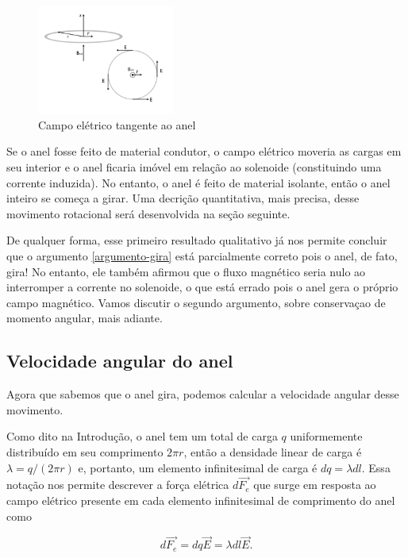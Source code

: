 \documentclass[
	article,
	11pt,
	oneside,
	a4paper,
	english,
	brazil,
	sumario=tradicional
	]{abntex2}
\begin{document}
\begin{figure}[htb]
    \caption{Campo elétrico tangente ao anel}\label{campo-tangencial-img}
    \centering
    \includegraphics[width=0.4\textwidth]{corrente_tangencial.png}
\end{figure}

Se o anel fosse feito de material condutor, o campo elétrico moveria as cargas em seu interior e o anel ficaria imóvel em relação ao solenoide (constituindo uma corrente induzida). No entanto, o anel é feito de material isolante, então o anel inteiro se começa a girar. Uma decrição quantitativa, mais precisa, desse movimento rotacional será desenvolvida na seção seguinte.

De qualquer forma, esse primeiro resultado qualitativo já nos permite concluir que o argumento \ref{argumento-gira} está parcialmente correto pois o anel, de fato, gira! No entanto, ele também afirmou que o fluxo magnético seria nulo ao interromper a corrente no solenoide, o que está errado pois o anel gera o próprio campo magnético. Vamos discutir o segundo argumento, sobre conservaçao de momento angular, mais adiante.

\subsection{Velocidade angular do anel}

Agora que sabemos que o anel gira, podemos calcular a velocidade angular desse movimento.

Como dito na Introdução, o anel tem um total de carga $q$ uniformemente distribuído em seu comprimento $2\pi r$, então a densidade linear de carga é $\lambda = q/(2\pi r)$ e, portanto, um elemento infinitesimal de carga é $dq = \lambda dl$. Essa notação nos permite descrever a força elétrica $d \vec{F_e}$ que surge em resposta ao campo elétrico presente em cada elemento infinitesimal de comprimento do anel como

\begin{equation}
    d \vec{F_e} = dq \vec{E} = \lambda dl \vec{E}.
\end{equation}
\end{document}
